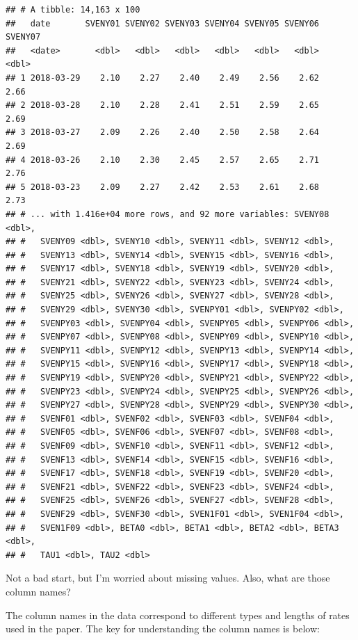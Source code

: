 \documentclass[]{book}
\theoremstyle{definition}
\theoremstyle{definition}
\theoremstyle{definition}
\theoremstyle{remark}
\begin{document}
\begin{verbatim}
## # A tibble: 14,163 x 100
##   date       SVENY01 SVENY02 SVENY03 SVENY04 SVENY05 SVENY06 SVENY07
##   <date>       <dbl>   <dbl>   <dbl>   <dbl>   <dbl>   <dbl>   <dbl>
## 1 2018-03-29    2.10    2.27    2.40    2.49    2.56    2.62    2.66
## 2 2018-03-28    2.10    2.28    2.41    2.51    2.59    2.65    2.69
## 3 2018-03-27    2.09    2.26    2.40    2.50    2.58    2.64    2.69
## 4 2018-03-26    2.10    2.30    2.45    2.57    2.65    2.71    2.76
## 5 2018-03-23    2.09    2.27    2.42    2.53    2.61    2.68    2.73
## # ... with 1.416e+04 more rows, and 92 more variables: SVENY08 <dbl>,
## #   SVENY09 <dbl>, SVENY10 <dbl>, SVENY11 <dbl>, SVENY12 <dbl>,
## #   SVENY13 <dbl>, SVENY14 <dbl>, SVENY15 <dbl>, SVENY16 <dbl>,
## #   SVENY17 <dbl>, SVENY18 <dbl>, SVENY19 <dbl>, SVENY20 <dbl>,
## #   SVENY21 <dbl>, SVENY22 <dbl>, SVENY23 <dbl>, SVENY24 <dbl>,
## #   SVENY25 <dbl>, SVENY26 <dbl>, SVENY27 <dbl>, SVENY28 <dbl>,
## #   SVENY29 <dbl>, SVENY30 <dbl>, SVENPY01 <dbl>, SVENPY02 <dbl>,
## #   SVENPY03 <dbl>, SVENPY04 <dbl>, SVENPY05 <dbl>, SVENPY06 <dbl>,
## #   SVENPY07 <dbl>, SVENPY08 <dbl>, SVENPY09 <dbl>, SVENPY10 <dbl>,
## #   SVENPY11 <dbl>, SVENPY12 <dbl>, SVENPY13 <dbl>, SVENPY14 <dbl>,
## #   SVENPY15 <dbl>, SVENPY16 <dbl>, SVENPY17 <dbl>, SVENPY18 <dbl>,
## #   SVENPY19 <dbl>, SVENPY20 <dbl>, SVENPY21 <dbl>, SVENPY22 <dbl>,
## #   SVENPY23 <dbl>, SVENPY24 <dbl>, SVENPY25 <dbl>, SVENPY26 <dbl>,
## #   SVENPY27 <dbl>, SVENPY28 <dbl>, SVENPY29 <dbl>, SVENPY30 <dbl>,
## #   SVENF01 <dbl>, SVENF02 <dbl>, SVENF03 <dbl>, SVENF04 <dbl>,
## #   SVENF05 <dbl>, SVENF06 <dbl>, SVENF07 <dbl>, SVENF08 <dbl>,
## #   SVENF09 <dbl>, SVENF10 <dbl>, SVENF11 <dbl>, SVENF12 <dbl>,
## #   SVENF13 <dbl>, SVENF14 <dbl>, SVENF15 <dbl>, SVENF16 <dbl>,
## #   SVENF17 <dbl>, SVENF18 <dbl>, SVENF19 <dbl>, SVENF20 <dbl>,
## #   SVENF21 <dbl>, SVENF22 <dbl>, SVENF23 <dbl>, SVENF24 <dbl>,
## #   SVENF25 <dbl>, SVENF26 <dbl>, SVENF27 <dbl>, SVENF28 <dbl>,
## #   SVENF29 <dbl>, SVENF30 <dbl>, SVEN1F01 <dbl>, SVEN1F04 <dbl>,
## #   SVEN1F09 <dbl>, BETA0 <dbl>, BETA1 <dbl>, BETA2 <dbl>, BETA3 <dbl>,
## #   TAU1 <dbl>, TAU2 <dbl>
\end{verbatim}

Not a bad start, but I'm worried about missing values. Also, what are
those column names?

The column names in the data correspond to different types and lengths
of rates used in the paper. The key for understanding the column names
is below:
\end{document}
